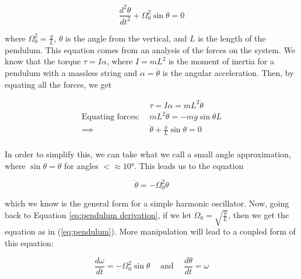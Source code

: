 \documentclass[12pt]{article}
\begin{document}
    \begin{equation}
        \frac{d^2\theta}{dt^2}+\Omega_0^2\sin\theta = 0 
        \label{eq:pendulum}
    \end{equation}

    \noindent
    where $\Omega_0^2 = \frac{g}{L}$, $\theta$ is the angle from the vertical, and $L$ is the 
    length of the pendulum. This equation comes from an analysis of the forces on the system. 
    We know that the torque $\tau = I\alpha$, where $I = mL^2$ is the moment of inertia for a pendulum 
    with a massless string and $\alpha = \ddot{\theta}$ is the angular acceleration. Then, by 
    equating all the forces, we get

    \begin{equation*}
        \begin{split}
            &\tau = I\alpha = mL^2\ddot{\theta} \\
            \textrm{Equating forces:}\hspace{5pt} &mL^2\ddot{\theta} = -mg\sin\theta L \\
            \implies &\ddot{\theta} + \frac{g}{L}\sin\theta = 0 \\
        \end{split}
        \label{eq:pendulum derivation}
    \end{equation*}

    \noindent
    In order to simplify this, we can take what we call a small angle approximation, where 
    $\sin\theta = \theta$ for angles $<\approx\ang{10}$. This leads us to the equation 

    \begin{equation}
        \ddot{\theta} = -\Omega_0^2 \theta
        \label{eq:SHM}
    \end{equation}

    \noindent
    which we know is the general form for a simple harmonic oscillator.
    \newline
    \newline
    Now, going back to Equation \ref{eq:pendulum derivation}, if we let 
    $\Omega_0 = \sqrt{\frac{g}{L}}$, then we get the equation as in (\ref{eq:pendulum}). More 
    manipulation will lead to a coupled form of this equation:

    \begin{equation}
        \frac{d\omega}{dt}=-\Omega_0^2 \sin\theta 
        \hspace{15pt}
        \textrm{and}
        \hspace{15pt}
        \frac{d\theta}{dt}=\omega
        \label{eq:coupled pendulum}
    \end{equation}
\end{document}
